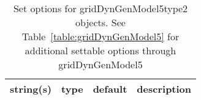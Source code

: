 \begin{table}[ht]
\centering
\begin{tabular}{p{5cm} c c p{7cm}}
\hline
string(s) & type & default & description \\
\hline
\hline
\end{tabular}
\caption{Set options for gridDynGenModel5type2 objects. See Table~\ref{table:gridDynGenModel5} for additional settable options through gridDynGenModel5}
\label{table:gridDynGenModel5type2}
\end{table}
